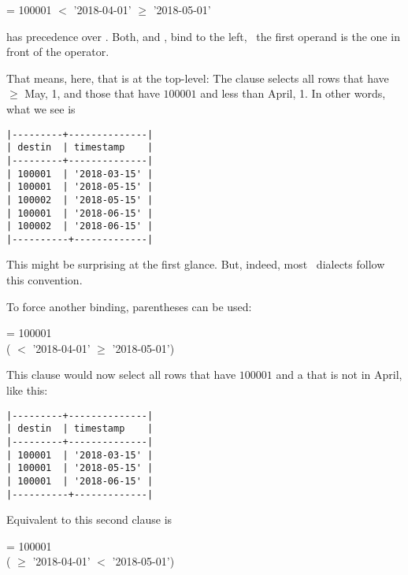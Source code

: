   = 100001
  $<$ '2018-04-01'
  $\ge$ '2018-05-01'

 has precedence over .
Both,  and , bind to the left,
\ie\ the first operand is the one in front of the operator.

That means, here, that  is at the top-level:
The clause selects all rows that have 
$\ge$ May, 1, and those that have  $100001$
and  less than April, 1.
In other words, what we see is

\begin{minipage}{\textwidth}
\begin{verbatim}
|---------+--------------|
| destin  | timestamp    |
|---------+--------------|
| 100001  | '2018-03-15' |
| 100001  | '2018-05-15' |
| 100002  | '2018-05-15' |
| 100001  | '2018-06-15' |
| 100002  | '2018-06-15' |
|----------+-------------|
\end{verbatim}
\end{minipage}

This might be surprising at the first glance.
But, indeed, most \sql\ dialects follow this convention.

To force another binding, parentheses can be used:

\begin{minipage}{\textwidth}
  = 100001 \\
\hspace*{0.45cm} ( $<$ '2018-04-01'
  $\ge$ '2018-05-01')
\end{minipage}

This clause would now select all rows
that have  $100001$ and
a  that is not in April,
like this:

\begin{minipage}{\textwidth}
\begin{verbatim}
|---------+--------------|
| destin  | timestamp    |
|---------+--------------|
| 100001  | '2018-03-15' |
| 100001  | '2018-05-15' |
| 100001  | '2018-06-15' |
|----------+-------------|
\end{verbatim}
\end{minipage}

Equivalent to this second clause is

  = 100001 \\
\hspace*{0.45cm}  
( $\ge$ '2018-04-01'
  $<$ '2018-05-01')

